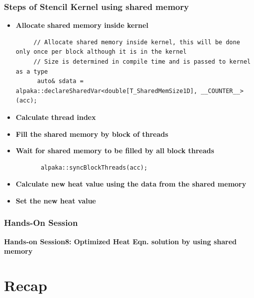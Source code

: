 \documentclass[9pt]{beamer}
\begin{document}
\begin{frame}[fragile]
\frametitle{Steps of Stencil Kernel using shared memory}
\begin{itemize}
    \item \textbf{Allocate shared memory inside kernel}
   \lstset{basicstyle=\ttfamily\scriptsize}
     \begin{lstlisting}
     // Allocate shared memory inside kernel, this will be done only once per block although it is in the kernel
     // Size is determined in compile time and is passed to kernel as a type
      auto& sdata = alpaka::declareSharedVar<double[T_SharedMemSize1D], __COUNTER__>(acc);
        \end{lstlisting}
 \item \textbf{Calculate thread index}
  \item \textbf{Fill the shared memory by block of threads}
 \item \textbf{Wait for shared memory to be filled by all block threads}
 \begin{lstlisting}
       alpaka::syncBlockThreads(acc);
   \end{lstlisting}
 \item \textbf{Calculate new heat value using the data from the shared memory}
 \item \textbf{Set the new heat value}
 \end{itemize}
\end{frame}







\begin{frame}
\frametitle{Hands-On Session}
\begin{center}
      \Huge \textbf{Hands-on Session8: Optimized Heat Eqn. solution by using shared memory}
  \end{center}
\end{frame}


\section{Recap}
\end{document}
